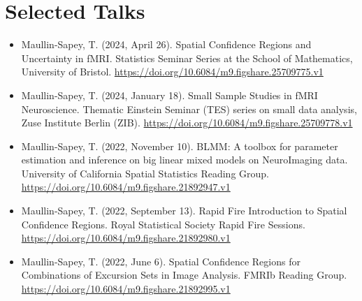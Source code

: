 \documentclass{friggeri-cv}
\begin{document}
\section{Selected Talks}
\footnotesize{
\begin{itemize}
    \item Maullin-Sapey, T. (2024, April 26). Spatial Confidence Regions and Uncertainty in fMRI. Statistics Seminar Series at the School of Mathematics, University of Bristol. \url{https://doi.org/10.6084/m9.figshare.25709775.v1}
    \item Maullin-Sapey, T. (2024, January 18). Small Sample Studies in fMRI Neuroscience. Thematic Einstein Seminar (TES) series on small data analysis, Zuse Institute Berlin (ZIB). \url{https://doi.org/10.6084/m9.figshare.25709778.v1}
    \item Maullin-Sapey, T. (2022, November 10). BLMM: A toolbox for parameter estimation and inference on big linear mixed models on NeuroImaging data. University of California Spatial Statistics Reading Group. \url{https://doi.org/10.6084/m9.figshare.21892947.v1}
    \item Maullin-Sapey, T. (2022, September 13). Rapid Fire Introduction to Spatial Confidence Regions. Royal Statistical Society Rapid Fire Sessions. \url{https://doi.org/10.6084/m9.figshare.21892980.v1}
    \item Maullin-Sapey, T. (2022, June 6). Spatial Confidence Regions for Combinations of Excursion Sets in Image Analysis. FMRIb Reading Group. \url{https://doi.org/10.6084/m9.figshare.21892995.v1}
\end{itemize}
}
\normalsize
\end{document}

